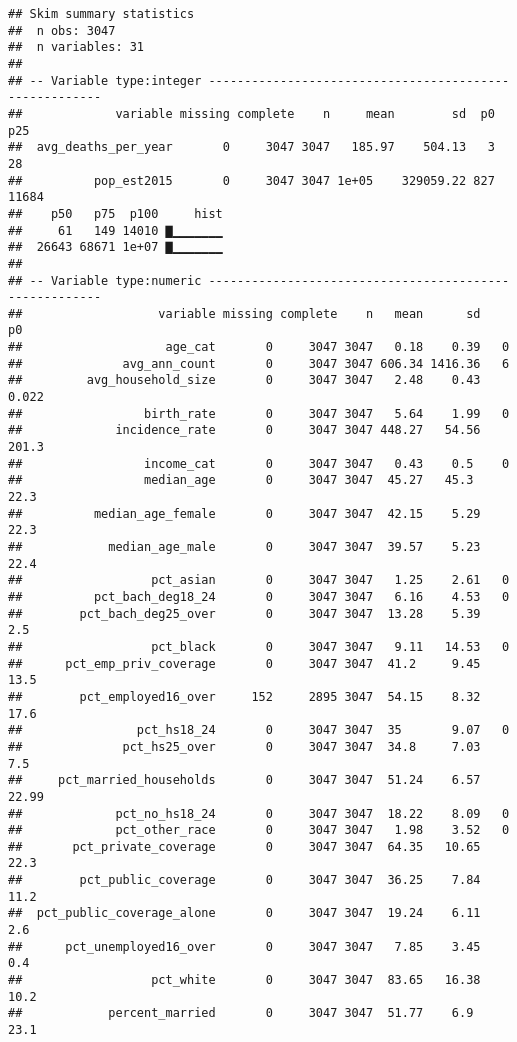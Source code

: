 \documentclass[]{article}
\begin{document}
\begin{verbatim}
## Skim summary statistics
##  n obs: 3047 
##  n variables: 31 
## 
## -- Variable type:integer -------------------------------------------------------
##             variable missing complete    n     mean        sd  p0   p25
##  avg_deaths_per_year       0     3047 3047   185.97    504.13   3    28
##          pop_est2015       0     3047 3047 1e+05    329059.22 827 11684
##    p50   p75  p100     hist
##     61   149 14010 ▇▁▁▁▁▁▁▁
##  26643 68671 1e+07 ▇▁▁▁▁▁▁▁
## 
## -- Variable type:numeric -------------------------------------------------------
##                   variable missing complete    n   mean      sd      p0
##                    age_cat       0     3047 3047   0.18    0.39   0    
##              avg_ann_count       0     3047 3047 606.34 1416.36   6    
##         avg_household_size       0     3047 3047   2.48    0.43   0.022
##                 birth_rate       0     3047 3047   5.64    1.99   0    
##             incidence_rate       0     3047 3047 448.27   54.56 201.3  
##                 income_cat       0     3047 3047   0.43    0.5    0    
##                 median_age       0     3047 3047  45.27   45.3   22.3  
##          median_age_female       0     3047 3047  42.15    5.29  22.3  
##            median_age_male       0     3047 3047  39.57    5.23  22.4  
##                  pct_asian       0     3047 3047   1.25    2.61   0    
##          pct_bach_deg18_24       0     3047 3047   6.16    4.53   0    
##        pct_bach_deg25_over       0     3047 3047  13.28    5.39   2.5  
##                  pct_black       0     3047 3047   9.11   14.53   0    
##      pct_emp_priv_coverage       0     3047 3047  41.2     9.45  13.5  
##        pct_employed16_over     152     2895 3047  54.15    8.32  17.6  
##                pct_hs18_24       0     3047 3047  35       9.07   0    
##              pct_hs25_over       0     3047 3047  34.8     7.03   7.5  
##     pct_married_households       0     3047 3047  51.24    6.57  22.99 
##             pct_no_hs18_24       0     3047 3047  18.22    8.09   0    
##             pct_other_race       0     3047 3047   1.98    3.52   0    
##       pct_private_coverage       0     3047 3047  64.35   10.65  22.3  
##        pct_public_coverage       0     3047 3047  36.25    7.84  11.2  
##  pct_public_coverage_alone       0     3047 3047  19.24    6.11   2.6  
##      pct_unemployed16_over       0     3047 3047   7.85    3.45   0.4  
##                  pct_white       0     3047 3047  83.65   16.38  10.2  
##            percent_married       0     3047 3047  51.77    6.9   23.1  

\end{verbatim}
\end{document}
